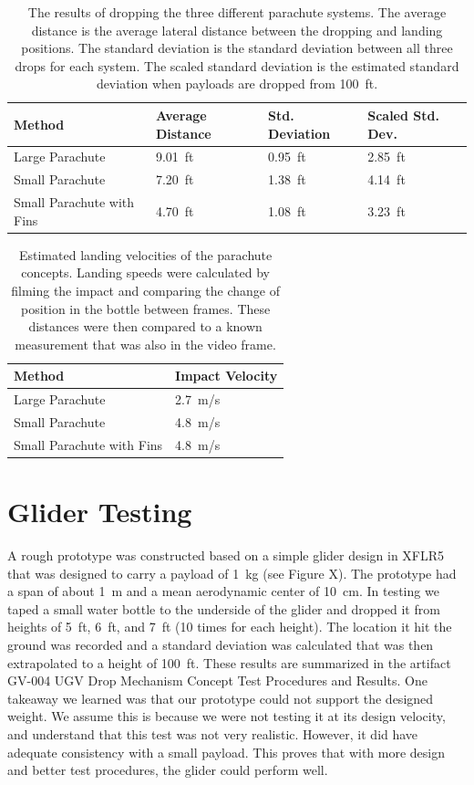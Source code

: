 \documentclass[]{auvsi_doc}
\begin{document}
\begin{table}[h!]
\caption{The results of dropping the three different parachute systems. The average distance is the average lateral distance between the dropping and landing positions. The standard deviation is the standard deviation between all three drops for each system. The scaled standard deviation is the estimated standard deviation when payloads are dropped from 100~ft. }
\label{table:results}

\begin{tabular}{| l | l | l | l |}
\hline
Method & Average Distance & Std. Deviation & Scaled Std. Dev.\\
\hline
Large Parachute & 9.01~ft  & 0.95~ft & 2.85~ft\\
Small Parachute & 7.20~ft  & 1.38~ft & 4.14~ft\\
Small Parachute with Fins & 4.70~ft & 1.08~ft & 3.23~ft\\
\hline

\end{tabular}

\end{table}

\begin{table}[h!]
\caption{Estimated landing velocities of the parachute concepts. Landing speeds were calculated by filming the impact and comparing the change of position in the bottle between frames. These distances were then compared to a known measurement that was also in the video frame.}
\label{table:results_v}

\begin{tabular}{| l | l |}
\hline
Method & Impact Velocity\\
\hline
Large Parachute & 2.7~m/s \\
Small Parachute & 4.8~m/s \\
Small Parachute with Fins & 4.8~m/s \\
\hline

\end{tabular}

\end{table}

\section{Glider Testing}
A rough prototype was constructed based on a simple glider design in XFLR5 that was designed to carry a payload of 1~kg (see Figure X). The prototype had a span of about 1~m and a mean aerodynamic center of 10~cm. In testing we taped a small water bottle to the underside of the glider and dropped it from heights of 5~ft, 6~ft, and 7~ft (10 times for each height). The location it hit the ground was recorded and a standard deviation was calculated that was then extrapolated to a height of 100~ft. These results are summarized in the artifact GV-004 UGV Drop Mechanism Concept Test Procedures and Results. One takeaway we learned was that our prototype could not support the designed weight. We assume this is because we were not testing it at its design velocity, and understand that this test was not very realistic. However, it did have adequate consistency with a small payload. This proves that with more design and better test procedures, the glider could perform well. 
\end{document}
